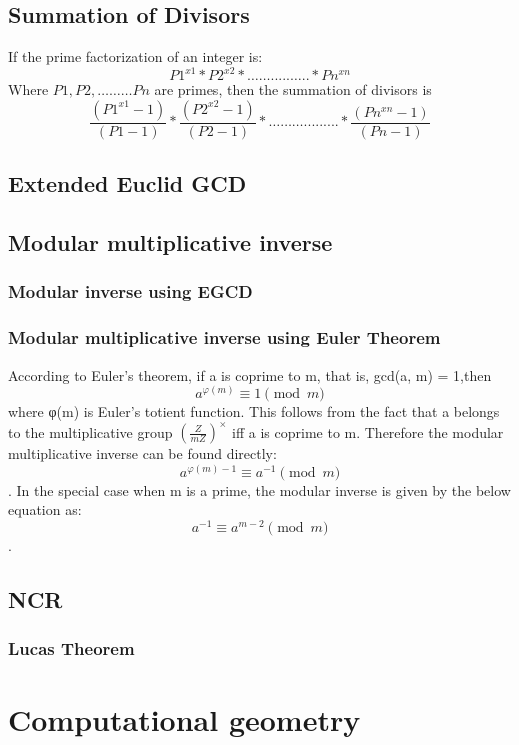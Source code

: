 \documentclass[11pt]{report}
\begin{document}
\section{Summation of Divisors}
If the prime factorization of an integer is:
		$$P1^{x1}*P2^{x2}*…….....…..*Pn^{xn}$$
Where $P1,P2,………Pn$ are primes, then the summation of divisors is
		$$\frac{(P1^{x1}  -1)}{(P1-1)} * \frac{(P2^{x2}  -1)}{(P2-1)} *………......... *\frac{(Pn^{xn}  -1)}{(Pn-1)}$$
\section{Extended Euclid GCD}

\section{Modular multiplicative inverse}
\subsection{Modular inverse using EGCD}

\subsection{Modular multiplicative inverse using Euler Theorem}
According to Euler's theorem, if a is coprime to m, that is, gcd(a, m) = 1,then
$$a^{\varphi(m)} \equiv 1 \pmod{m}$$
where φ(m) is Euler's totient function. This follows from the fact that a belongs to the multiplicative group $(\frac{Z}{mZ})^×$ iff a is coprime to m. Therefore the modular multiplicative inverse can be found directly:
$$a^{\varphi(m)-1} \equiv a^{-1} \pmod{m}$$.
In the special case when m is a prime, the modular inverse is given by the below equation as:
$$a^{-1} \equiv a^{m-2} \pmod{m}$$.
\section{NCR}
\subsection{Lucas Theorem}



\chapter{Computational geometry}
\end{document}
